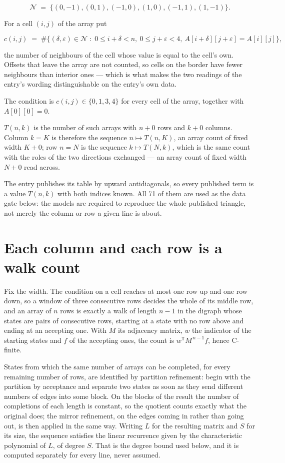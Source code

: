 \documentclass[11pt]{article}
\theoremstyle{definition}
\begin{document}
\[\mathcal{N} \;=\; \{(0,-1), (0,1), (-1,0), (1,0), (-1,1), (1,-1)\}.\]

For a cell $(i,j)$ of the array put

\[c(i,j) \;=\; \#\bigl\{(\delta,\varepsilon)\in\mathcal{N} \;:\; 0\le i+\delta<n,\ 0\le j+\varepsilon<4,\ A[i+\delta][j+\varepsilon] = A[i][j]\bigr\},\]

the number of neighbours of the cell whose value is equal to the cell's own. Offsets that leave the array are not counted, so cells on the border have fewer neighbours than interior ones --- which is what makes the two readings of the entry's wording distinguishable on the entry's own data.

The condition is $c(i,j) \in \{0, 1, 3, 4\}$ for every cell of the array, together with $A[0][0]=0$.

$T(n,k)$ is the number of such arrays with $n + 0$ rows and $k + 0$ columns. Column $k = K$ is therefore the sequence $n \mapsto T(n,K)$, an array count of fixed width $K + 0$; row $n = N$ is the sequence $k \mapsto T(N,k)$, which is the same count with the roles of the two directions exchanged --- an array count of fixed width $N + 0$ read across.

The entry publishes its table by upward antidiagonals, so every published term is a value $T(n,k)$ with both indices known. All 71 of them are used as the data gate below: the models are required to reproduce the whole published triangle, not merely the column or row a given line is about.

\section{Each column and each row is a walk count}

Fix the width. The condition on a cell reaches at most one row up and one row down, so a window of three consecutive rows decides the whole of its middle row, and an array of $n$ rows is exactly a walk of length $n-1$ in the digraph whose states are pairs of consecutive rows, starting at a state with no row above and ending at an accepting one. With $M$ its adjacency matrix, $w$ the indicator of the starting states and $f$ of the accepting ones, the count is $w^{\mathsf T}M^{\,n-1}f$, hence C-finite.

States from which the same number of arrays can be completed, for every remaining number of rows, are identified by partition refinement: begin with the partition by acceptance and separate two states as soon as they send different numbers of edges into some block. On the blocks of the result the number of completions of each length is constant, so the quotient counts exactly what the original does; the mirror refinement, on the edges coming in rather than going out, is then applied in the same way. Writing $L$ for the resulting matrix and $S$ for its size, the sequence satisfies the linear recurrence given by the characteristic polynomial of $L$, of degree $S$. That is the degree bound used below, and it is computed separately for every line, never assumed.
\end{document}

